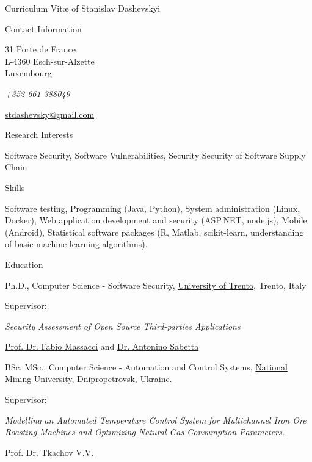 \documentclass[11pt]{custom-style}
\providecommand*\email[1]{\href{mailto:#1}{#1}}
\begin{document}
\begin{cv}{Curriculum Vit\ae{} of Stanislav Dashevskyi}
  \begin{cvlist}{Contact Information}
    \item 31 Porte de France\\
        L-4360 Esch-sur-Alzette\\
        Luxembourg
    \item \textit{+352 661 388049}
      \item \email{stdashevsky@gmail.com}
  \end{cvlist}

  \begin{cvlist}{Research Interests}
  \item Software Security, Software Vulnerabilities, Security
    Security of Software Supply Chain
  \end{cvlist}

  \begin{cvlist}{Skills}
  \item Software testing, Programming (Java, Python), System administration (Linux, Docker), Web application development
      and security (ASP.NET, node.js), Mobile (Android), Statistical software packages (R, Matlab, scikit-learn,
      understanding of basic machine learning algorithms).
  \end{cvlist}

  \begin{cvlist}{Education}
  \item[2017] Ph.D., Computer Science - Software Security,
    \href{http://www.unitn.it/en}{University of Trento}, Trento, Italy
    \begin{labeling}{Supervisor:}
    \item[Thesis:] \emph{Security Assessment of Open Source
        Third-parties Applications}
    \item[Supervisors:] \href{http://disi.unitn.it/~massacci/}
      {Prof. Dr. Fabio Massacci} and \href{https://www.sabetta.com/}
      {Dr. Antonino Sabetta}
    \end{labeling}
  \item[2010] BSc. MSc., Computer Science - Automation and Control
    Systems, \href{http://www.nmu.org.ua/en/}{National Mining
      University}, Dnipropetrovsk, Ukraine.
    \begin{labeling}{Supervisor:}
    \item[Thesis:] \emph{Modelling an Automated Temperature Control
        System for Multichannel Iron Ore Roasting Machines and
        Optimizing Natural Gas Consumption Parameters.}
    \item[Supervisor:]
      \href{http://aks.nmu.org.ua/en/Dep_ACS/Tkachev.php}
      {Prof. Dr. Tkachov V.V.}
    \end{labeling}
  \end{cvlist}


\end{cv}
\end{document}
